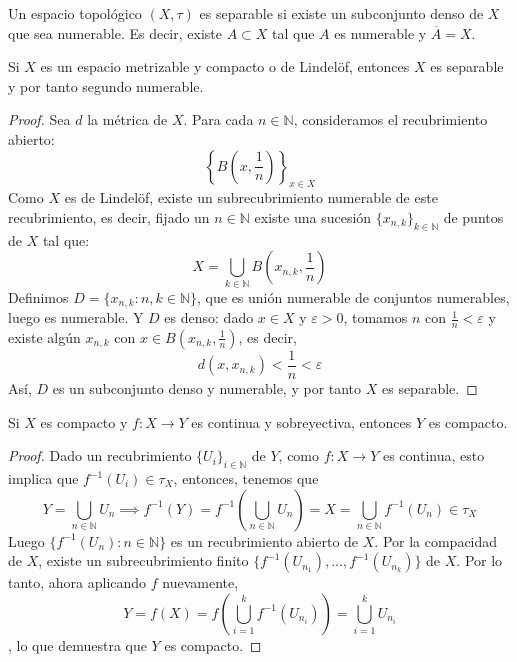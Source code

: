 \begin{definición}
    Un espacio topológico $(X, \tau)$ es separable si existe un subconjunto denso de $X$ que sea numerable. Es decir, existe $A \subset X$ tal que $A$ es numerable y $\overline{A} = X$.
    
\end{definición}
\begin{proposición}
    Si $X$ es un espacio metrizable y compacto o de Lindelöf, entonces $X$ es separable y por tanto segundo numerable.
\end{proposición}
\begin{proof}
    Sea $d$ la métrica de $X$. Para cada $n \in \mathbb{N}$, consideramos el recubrimiento abierto: 
    $$\left\{B(x, \frac{1}{n})\right\}_{x \in X}$$
    Como $X$ es de Lindelöf, existe un subrecubrimiento numerable de este recubrimiento, es decir, fijado un $n \in \mathbb{N}$ existe una sucesión $\{x_{n, k}\}_{k \in \mathbb{N}}$ de puntos de $X$ tal que:
    $$X = \bigcup_{k \in \mathbb{N}} B\left(x_{n, k}, \frac{1}{n}\right)$$
    Definimos $D = \{x_{n, k} : n, k \in \mathbb{N}\}$, que es unión numerable de conjuntos numerables, luego es numerable. Y $D$ es denso: dado $x \in X$ y $\varepsilon > 0$, tomamos $n$ con $\frac{1}{n} < \varepsilon$ y existe algún $x_{n, k}$ con $x \in B(x_{n, k}, \frac{1}{n})$, es decir, 
    $$d(x, x_{n, k}) < \frac{1}{n} < \varepsilon$$
    Así, $D$ es un subconjunto denso y numerable, y por tanto $X$ es separable. 
\end{proof}
\begin{proposición}
    Si $X$ es compacto y $f: X \to Y$ es continua y sobreyectiva, entonces $Y$ es compacto.     
\end{proposición}
\begin{proof}
    Dado un recubrimiento $\{U_i\}_{i \in \mathbb{N}}$ de $Y$, como $f: X \to Y$ es continua, esto implica que $f^{-1}(U_i) \in \tau_X$, entonces, tenemos que
    $$ Y = \bigcup_{n \in \mathbb{N}} U_n \implies f^{-1}(Y) = f^{-1}\left(\bigcup_{n \in \mathbb{N}} U_n\right) = X = \bigcup_{n \in \mathbb{N}} f^{-1}(U_n) \in \tau_X$$
    Luego $\{f^{-1}(U_n) : n \in \mathbb{N}\}$ es un recubrimiento abierto de $X$. Por la compacidad de $X$, existe un subrecubrimiento finito $\{f^{-1}(U_{n_1}), \ldots, f^{-1}(U_{n_k})\}$ de $X$. Por lo tanto, ahora aplicando $f$ nuevamente, 
    $$Y = f(X) = f\left(\bigcup_{i = 1}^{k} f^{-1}(U_{n_i})\right) = \bigcup_{i = 1}^{k} U_{n_i}$$, lo que demuestra que $Y$ es compacto. 
\end{proof}
